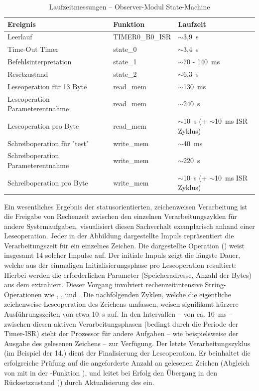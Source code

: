 \begin{table}[h!]
	\small
	\centering
	\begin{tabular}{|l|l|l|}
		\hline
		\textbf{Ereignis} & \textbf{Funktion} & \textbf{Laufzeit} \\\hline
		Leerlauf & TIMER0\_B0\_ISR & $\sim$3{,}9~\textmu s \\
		Time-Out Timer & state\_0 & $\sim$3{,}4~\textmu s \\
		Befehlsinterpretation & state\_1 & $\sim$70 - 140~ms \\
		Resetzustand & state\_2 & $\sim$6{,}3~\textmu s \\
		Leseoperation f\"ur 13 Byte & read\_mem & $\sim$130~ms \\
		Leseoperation Parameterentnahme & read\_mem & $\sim$240~\textmu s \\
		Leseoperation pro Byte & read\_mem & $\sim$10~\textmu s (+ $\sim$10~ms ISR Zyklus) \\
		Schreiboperation f\"ur "test" & write\_mem & $\sim$40~ms \\
		Schreiboperation Parameterentnahme & write\_mem & $\sim$220~\textmu s \\
		Schreiboperation pro Byte & write\_mem & $\sim$10~\textmu s (+ $\sim$10~ms ISR Zyklus) \\\hline
	\end{tabular}
	\caption{Laufzeitmessungen -- Observer-Modul State-Machine}
	\label{tab:laufzeitmessungen}
\end{table}

Ein wesentliches Ergebnis der statusorientierten, zeichenweisen Verarbeitung ist die Freigabe von Rechenzeit zwischen den einzelnen Verarbeitungszyklen f\"ur andere Systemaufgaben.  visualisiert diesen Sachverhalt exemplarisch anhand einer Leseoperation. Jeder in der Abbildung dargestellte Impuls repr\"asentiert die Verarbeitungszeit f\"ur ein einzelnes Zeichen. Die dargestellte Operation () weist insgesamt 14 solcher Impulse auf. Der initiale Impuls zeigt die l\"angste Dauer, welche aus der einmaligen Initialisierungsphase pro Leseoperation resultiert: Hierbei werden die erforderlichen Parameter (Speicheradresse, Anzahl der Bytes) aus dem  extrahiert. Dieser Vorgang involviert rechenzeitintensive String-Operationen wie , ,  und . Die nachfolgenden Zyklen, welche die eigentliche zeichenweise Leseoperation des Zeichens umfassen, weisen signifikant k\"urzere Ausf\"uhrungszeiten von etwa 10~\textmu s auf. In den Intervallen -- von ca. 10~ms -- zwischen diesen aktiven Verarbeitungsphasen (bedingt durch die Periode der Timer-ISR) steht der Prozessor f\"ur andere Aufgaben -- wie beispielsweise der Ausgabe des gelesenen Zeichens -- zur Verf\"ugung. Der letzte Verarbeitungszyklus (im Beispiel der 14.) dient der Finalisierung der Leseoperation. Er beinhaltet die erfolgreiche Pr\"ufung auf die angeforderte Anzahl an gelesenen Zeichen (Abgleich von  mit  in der -Funktion \Vgl {}), und leitet bei Erfolg den \"Ubergang in den R\"ucksetzzustand () durch Aktualisierung des  ein.\AI

